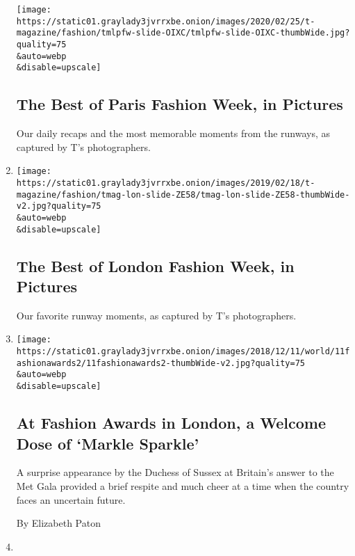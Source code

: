 \begin{enumerate}
  \texttt{[image: https://static01.graylady3jvrrxbe.onion/images/2020/02/25/t-magazine/fashion/tmlpfw-slide-OIXC/tmlpfw-slide-OIXC-thumbWide.jpg?quality=75\\\&auto=webp\\\&disable=upscale]}

  \hypertarget{the-best-of-paris-fashion-week-in-pictures}{%
  \subsection{The Best of Paris Fashion Week, in
  Pictures}\label{the-best-of-paris-fashion-week-in-pictures}}

  Our daily recaps and the most memorable moments from the runways, as
  captured by T's photographers.
\item
  \href{/2019/02/15/t-magazine/london-fashion-week-pictures.html}{}

  \texttt{[image: https://static01.graylady3jvrrxbe.onion/images/2019/02/18/t-magazine/fashion/tmag-lon-slide-ZE58/tmag-lon-slide-ZE58-thumbWide-v2.jpg?quality=75\\\&auto=webp\\\&disable=upscale]}

  \hypertarget{the-best-of-london-fashion-week-in-pictures}{%
  \subsection{The Best of London Fashion Week, in
  Pictures}\label{the-best-of-london-fashion-week-in-pictures}}

  Our favorite runway moments, as captured by T's photographers.
\item
  \href{/2018/12/11/fashion/british-fashion-awards-meghan-markle.html}{}

  \texttt{[image: https://static01.graylady3jvrrxbe.onion/images/2018/12/11/world/11fashionawards2/11fashionawards2-thumbWide-v2.jpg?quality=75\\\&auto=webp\\\&disable=upscale]}

  \hypertarget{at-fashion-awards-in-london-a-welcome-dose-of-markle-sparkle}{%
  \subsection{At Fashion Awards in London, a Welcome Dose of `Markle
  Sparkle'}\label{at-fashion-awards-in-london-a-welcome-dose-of-markle-sparkle}}

  A surprise appearance by the Duchess of Sussex at Britain's answer to
  the Met Gala provided a brief respite and much cheer at a time when
  the country faces an uncertain future.

  By Elizabeth Paton
\item
  \href{/2018/11/27/t-magazine/chable-maroma-hotel-burberry-westwood-fashion-culture-news.html}{}


\end{enumerate}
